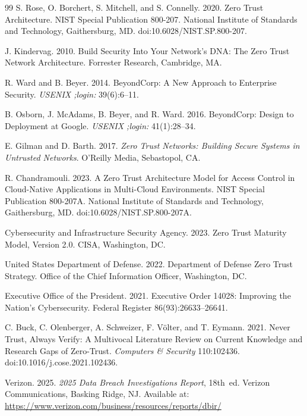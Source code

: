 \documentclass[unnumsec,webpdf,contemporary,large]{oup-authoring-template}
\theoremstyle{thmstyleone}
\theoremstyle{thmstyletwo}
\theoremstyle{thmstylethree}
\begin{document}
\begin{thebibliography}{99}
S. Rose, O. Borchert, S. Mitchell, and S. Connelly. 2020. Zero Trust Architecture.
NIST Special Publication 800-207. National Institute of Standards and Technology,
Gaithersburg, MD. doi:10.6028/NIST.SP.800-207.

J. Kindervag. 2010. Build Security Into Your Network's DNA: The Zero Trust Network
Architecture. Forrester Research, Cambridge, MA.

R. Ward and B. Beyer. 2014. BeyondCorp: A New Approach to Enterprise Security.
\textit{USENIX ;login:} 39(6):6--11.

B. Osborn, J. McAdams, B. Beyer, and R. Ward. 2016. BeyondCorp: Design to Deployment
at Google. \textit{USENIX ;login:} 41(1):28--34.

E. Gilman and D. Barth. 2017. \textit{Zero Trust Networks: Building Secure Systems in
Untrusted Networks}. O'Reilly Media, Sebastopol, CA.

R. Chandramouli. 2023. A Zero Trust Architecture Model for Access Control
in Cloud-Native Applications in Multi-Cloud Environments. NIST Special Publication
800-207A. National Institute of Standards and Technology, Gaithersburg, MD.
doi:10.6028/NIST.SP.800-207A.

Cybersecurity and Infrastructure Security Agency. 2023. Zero Trust Maturity Model,
Version 2.0. CISA, Washington, DC.

United States Department of Defense. 2022. Department of Defense Zero Trust Strategy.
Office of the Chief Information Officer, Washington, DC.

Executive Office of the President. 2021. Executive Order 14028: Improving the Nation's
Cybersecurity. Federal Register 86(93):26633--26641.

C. Buck, C. Olenberger, A. Schweizer, F. V\"{o}lter, and T. Eymann. 2021. Never Trust,
Always Verify: A Multivocal Literature Review on Current Knowledge and Research Gaps
of Zero-Trust. \textit{Computers \& Security} 110:102436.
doi:10.1016/j.cose.2021.102436.

Verizon. 2025. \textit{2025 Data Breach Investigations Report}, 18th~ed. Verizon Communications, Basking Ridge, NJ.
Available at: \url{https://www.verizon.com/business/resources/reports/dbir/}


\end{thebibliography}
\end{document}
